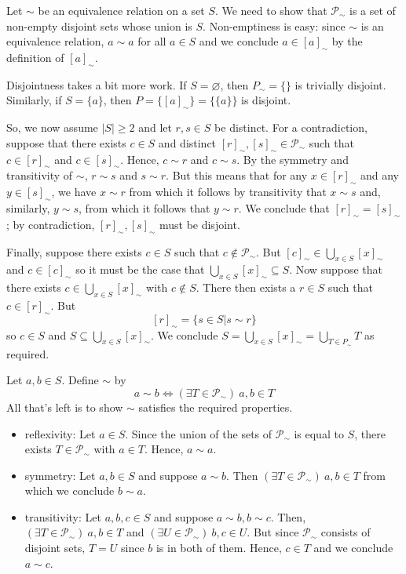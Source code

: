 \documentclass[a4paper]{report}
\newenvironment{ex}[1]
    {\noindent{\large \bf Exercise #1.}}{\vspace{0.5cm}}
\begin{document}
\begin{ex}{1.2}
  Let $\sim$ be an equivalence relation on a set $S$. We need to show that $\mathcal{P}_\sim$ is a
  set of non-empty disjoint sets whose union is $S$. Non-emptiness is easy: since $\sim$ is an
  equivalence relation, $a \sim a$ for all $a \in S$ and we conclude $a \in [a]_\sim$ by the
  definition of $[a]_\sim$.

  Disjointness takes a bit more work. If $S = \varnothing$, then $P_\sim = \{\}$ is trivially
  disjoint. Similarly, if $S = \{a\}$, then $P = \{[a]_\sim\} = \{\{a\}\}$ is disjoint. 

  So, we now assume $|S| \geq 2$ and let $r, s \in S$ be distinct. For a contradiction, suppose that
  there exists $c \in S$ and distinct $[r]_\sim, [s]_\sim \in \mathcal{P}_\sim$ such that $c \in
  [r]_\sim$ and $c\in [s]_\sim$. Hence, $c \sim r$ and $c \sim s$. By the symmetry and transitivity
  of $\sim$, $r \sim s$ and $s \sim r$. But this means that for any $x \in [r]_\sim$ and any $y \in
  [s]_\sim$, we have $x \sim r$ from which it follows by transitivity that $x \sim s$ and,
  similarly, $y \sim s$, from which it follows that $y \sim r$. We conclude that $[r]_\sim =
  [s]_\sim$; by contradiction, $[r]_\sim, [s]_\sim$ must be disjoint.

  Finally, suppose there exists $c \in S$ such that $c \notin \mathcal{P}_\sim$. But
  $[c]_\sim \in \bigcup_{x \in S} [x]_\sim$ and $c \in [c]_\sim$ so it must be the case
  that $\bigcup_{x \in S} [x]_\sim \subseteq S$. Now suppose that there exists $c \in \bigcup_{x \in S} [x]_\sim$
  with $c \notin S$. There then exists a $r \in S$ such that $c \in [r]_\sim$. But 
  \[
    [r]_\sim = \{s \in S| s \sim r\}
  \]
   so $c \in S$ and $S \subseteq \bigcup_{x \in S} [x]_\sim$. We conclude $S = \bigcup_{x
     \in S} [x]_\sim = \bigcup_{T \in P_{\sim}} T$ as required.
\end{ex}

\begin{ex}{1.3}
  Let $a, b \in S$. Define $\sim$ by
  \[
    a \sim b \Longleftrightarrow (\exists T \in \mathcal{P}_\sim)~a, b \in T
  \]
  All that's left is to show $\sim$ satisfies the required properties.
  \begin{itemize}
    \item reflexivity: Let $a \in S$. Since the union of the sets of $\mathcal{P}_\sim$ is equal to
      $S$, there exists $T \in \mathcal{P}_\sim$ with $a \in T$. Hence, $a \sim a$.
    \item symmetry: Let $a, b \in S$ and suppose $a \sim b$. Then $(\exists T \in
      \mathcal{P}_\sim)~a,b \in T$ from which we conclude $b \sim a$.
    \item transitivity: Let $a, b, c \in S$ and suppose $a \sim b, b \sim c$. Then, $(\exists T \in
      \mathcal{P}_\sim)~a,b \in T$ and $(\exists U \in \mathcal{P}_\sim)~b,c \in U$.  But since
      $\mathcal{P}_\sim$ consists of disjoint sets, $T = U$ since $b$ is in both of them. Hence, $c
      \in T$ and we conclude $a \sim c$.
  \end{itemize}
\end{ex}
\end{document}
